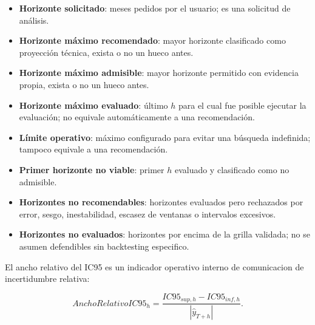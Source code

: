 ﻿\documentclass[12pt,letterpaper]{article}
\newcommand{\yhat}{\hat{y}}
\begin{document}
\begin{itemize}[leftmargin=*]
    \item \textbf{Horizonte solicitado}: meses pedidos por el usuario; es una solicitud de análisis.
    \item \textbf{Horizonte máximo recomendado}: mayor horizonte clasificado como proyección técnica, exista o no un hueco antes.
    \item \textbf{Horizonte máximo admisible}: mayor horizonte permitido con evidencia propia, exista o no un hueco antes.
    \item \textbf{Horizonte máximo evaluado}: último \(h\) para el cual fue posible ejecutar la evaluación; no equivale automáticamente a una recomendación.
    \item \textbf{Límite operativo}: máximo configurado para evitar una búsqueda indefinida; tampoco equivale a una recomendación.
    \item \textbf{Primer horizonte no viable}: primer \(h\) evaluado y clasificado como no admisible.
    \item \textbf{Horizontes no recomendables}: horizontes evaluados pero rechazados por error, sesgo, inestabilidad, escasez de ventanas o intervalos excesivos.
    \item \textbf{Horizontes no evaluados}: horizontes por encima de la grilla validada; no se asumen defendibles sin backtesting especifico.
\end{itemize}

El ancho relativo del IC95 es un indicador operativo interno de comunicacion de incertidumbre relativa:

\[
AnchoRelativoIC95_h=
\frac{IC95_{sup,h}-IC95_{inf,h}}{|\yhat_{T+h}|}.
\]
\end{document}
